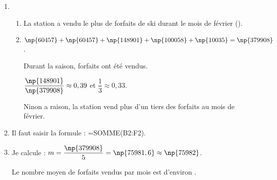 
\medskip

\begin{enumerate}
\item 
	\begin{enumerate}
		\item La station a vendu le plus de forfaits de ski durant le mois de février ().
		\item $\np{60457} + \np{60457} + \np{148901} + \np{100058} + \np{10035} = \np{379908}$.
		
Durant la saison,  forfaits ont été vendus.
		
$\dfrac{\np{148901}}{\np{379908}} \approx 0,39$ et $\dfrac{1}{3} \approx  0,33$.

Ninon a raison, la station vend plus d'un tiers des forfaits au mois de février.
	\end{enumerate}
\item Il faut saisir la formule : =SOMME(B2:F2).
\item Je calcule : $m = \dfrac{\np{379908}}{5} = \np{75981,6} \approx  \np{75982}$.
	
Le nombre moyen de forfaits vendus par mois est d'environ .
\end{enumerate}


\vspace{0,5cm}

